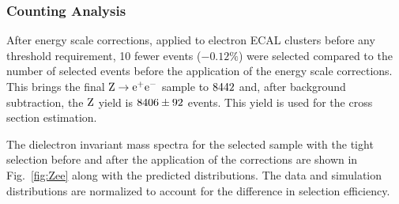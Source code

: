 \par
%
%
\subsubsection{Counting Analysis}
After energy scale corrections, applied to electron ECAL clusters before
any threshold requirement, 10 fewer events ($-0.12\%$) were selected compared to the number of selected
events before the application of the energy scale corrections.
This brings the final $\mathrm{Z} \rightarrow \mathrm{e}^+\mathrm{e}^-$ sample to $8442 $ and, after
background subtraction, the $\mathrm{Z}$ yield is $  8406 \pm 92   $ events.
This yield is used for the cross section estimation.
%
%


\par
The dielectron invariant mass spectra for the selected sample
with the tight selection before and after the application of the corrections are
shown in Fig.~\ref{fig:Zee} along with the predicted distributions.
The data and simulation distributions are normalized to account for the difference in selection
efficiency.

